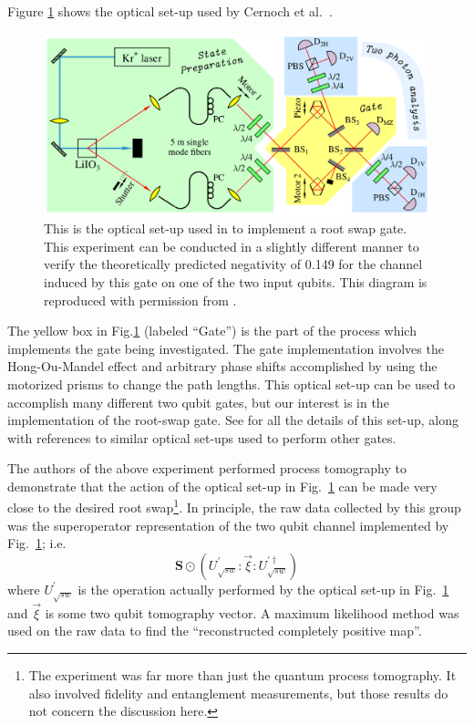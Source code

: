 Figure \ref{fig:opticalneg} shows the optical set-up used by Cernoch et al.\ \cite{Cernoch2008}.  
\begin{figure}[h!t]
\centering
\includegraphics[scale=1.5]{opticalneg1.png}
\caption{This is the optical set-up used in \cite{Cernoch2008} to implement a root swap gate.  This experiment can be conducted in a slightly different manner to verify the theoretically predicted negativity of 0.149 for the channel induced by this gate on one of the two input qubits.  This diagram is reproduced with permission from \cite{Cernoch2008}.}
\label{fig:opticalneg}
\end{figure}
The yellow box in Fig.\ref{fig:opticalneg} (labeled ``Gate'') is the part of the process which implements the gate being investigated.  The gate implementation involves the Hong-Ou-Mandel effect and arbitrary phase shifts accomplished by using the motorized prisms to change the path lengths.  This optical set-up can be used to accomplish many different two qubit gates, but our interest is in the implementation of the root-swap gate.  See \cite{Cernoch2008} for all the details of this set-up, along with references to similar optical set-ups used to perform other gates.   

The authors of the above experiment performed process tomography to demonstrate that the action of the optical set-up in Fig.\ \ref{fig:opticalneg} can be made very close to the desired root swap\footnote{The experiment was far more than just the quantum process tomography.  It also involved fidelity and entanglement measurements, but those results do not concern the discussion here.}.  In principle, the raw data collected by this group was the superoperator representation of the two qubit channel implemented by Fig.\ \ref{fig:opticalneg}; i.e.\
$$
\mathbf{S} \odot \left( U_{\sqrt{sw}}^\prime: \vec{\xi} :U_{\sqrt{sw}}^{\prime\dagger}\right)
$$
where $U_{\sqrt{sw}}^\prime$ is the operation actually performed by the optical set-up in Fig.\ \ref{fig:opticalneg} and $\vec{\xi}$ is some two qubit tomography vector.  A maximum likelihood method was used on the raw data to find the ``reconstructed completely positive map''.

